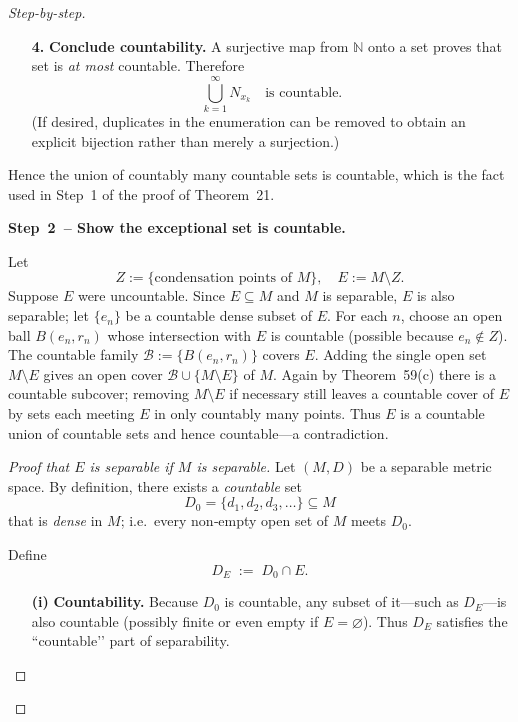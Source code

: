 \documentclass[12pt]{article}
\theoremstyle{definition} %
\theoremstyle{plain} %
\begin{document}
\begin{proof}[Step-by-step]
\begin{enumerate}
  \item[\textbf{4.}] %
      \textbf{Conclude countability.}  
      A surjective map from $\mathbb N$ onto a set proves that set is
      \emph{at most} countable.  Therefore
      \[
          \bigcup_{k=1}^{\infty} N_{x_k}
          \quad\text{is countable.}
      \]
      (If desired, duplicates in the enumeration can be removed to obtain
      an explicit bijection rather than merely a surjection.)
\end{enumerate}

\noindent
Hence the union of countably many countable sets is countable, which is the
fact used in Step 1 of the proof of Theorem 21.  \qedhere

  \medskip
  \textbf{Step 2 -- Show the exceptional set is countable.}

  Let
  \[
    Z := \{\text{condensation points of }M\}, 
    \quad 
    E := M\setminus Z.
  \]
  Suppose \(E\) were uncountable.  Since \(E\subseteq M\) and \(M\) is
  separable, \(E\) is also separable; let \(\{e_n\}\) be a countable
  dense subset of \(E\).  For each \(n\), choose an open ball
  \(B(e_n,r_n)\) whose intersection with \(E\) is countable (possible
  because \(e_n\notin Z\)).  The countable family
  \(\mathcal B := \{B(e_n,r_n)\}\) covers \(E\).  Adding the single
  open set \(M\setminus E\) gives an open cover
  \(\mathcal B\cup\{M\setminus E\}\) of \(M\).  Again by Theorem 59(c)
  there is a countable subcover; removing \(M\setminus E\) if necessary
  still leaves a countable cover of \(E\) by sets each meeting \(E\) in
  only countably many points.  Thus \(E\) is a countable union of
  countable sets and hence countable—a contradiction.

\begin{proof}[Proof that \(E\) is separable if \(M\) is separable]
  Let \((M,D)\) be a separable metric space.  
  By definition, there exists a \emph{countable} set
  \[
      D_0=\{d_1,d_2,d_3,\dots\}\subseteq M
  \]
  that is \emph{dense} in \(M\); i.e.\ every non‑empty open set of \(M\)
  meets \(D_0\).
  
  \medskip
  Define 
  \[
      D_E\;:=\;D_0\cap E.
  \]
  \begin{enumerate}
      \item[\textbf{(i)}] \textbf{Countability.}  
            Because \(D_0\) is countable, any subset of it—such as
            \(D_E\)—is also countable (possibly finite or even empty if
            \(E=\varnothing\)).  Thus \(D_E\) satisfies the “countable’’ part
            of separability.
            

\end{enumerate}
\end{proof}
\end{proof}
\end{document}

